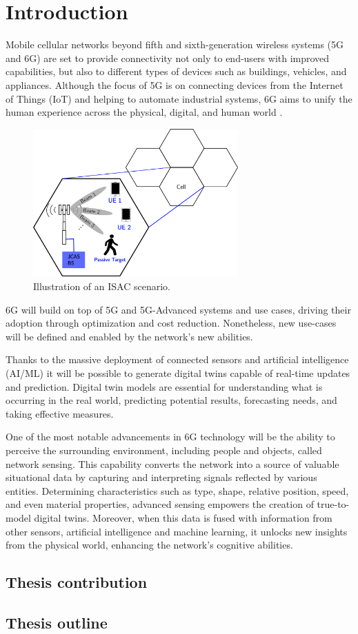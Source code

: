 \chapter{Introduction}
\label{chap_intro}

Mobile cellular networks beyond fifth and sixth-generation wireless systems (5G and 6G) are set to provide connectivity not only to end-users with improved capabilities, but also to different types of devices such as buildings, vehicles, and appliances.
Although the focus of 5G is on connecting devices from the Internet of Things (IoT) and helping to automate industrial systems, 6G aims to unify the human experience across the physical, digital, and human world \cite{6G-explained-NOKIA}.


\begin{figure}[H]
    \centering
    \includegraphics[width=0.7\textwidth]{Images/introduction/isac-scheme-1.png}
    \caption{Illustration of an ISAC scenario.}
    \label{fig:isac-scheme-1}
\end{figure}

6G will build on top of 5G and 5G-Advanced systems and use cases, driving their adoption through optimization and cost reduction. Nonetheless, new use-cases will be defined and enabled by the network's new abilities.

Thanks to the massive deployment of connected sensors and artificial intelligence (AI/ML) it will be possible to generate digital twins capable of real-time updates and prediction.  Digital twin models are essential for understanding what is occurring in the real world, predicting potential results, forecasting needs, and taking effective measures.

One of the most notable advancements in 6G technology will be the ability to perceive the surrounding environment, including people and objects, called network sensing. This capability converts the network into a source of valuable situational data by capturing and interpreting signals reflected by various entities. Determining characteristics such as type, shape, relative position, speed, and even material properties, advanced sensing empowers the creation of true-to-model digital twins. Moreover, when this data is fused with information from other sensors, artificial intelligence and machine learning, it unlocks new insights from the physical world, enhancing the network's cognitive abilities.

\section{Thesis contribution}

\section{Thesis outline}
